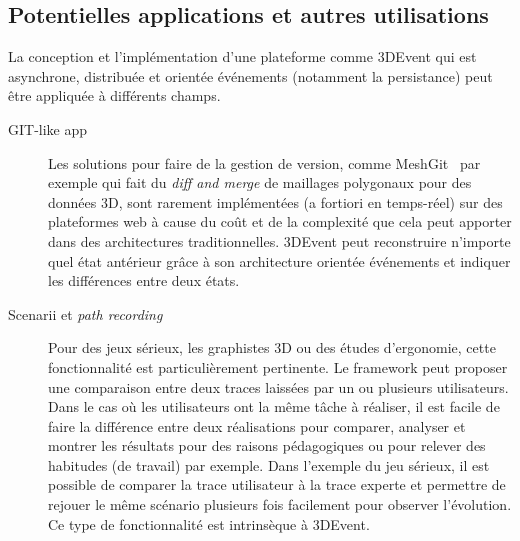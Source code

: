 \subsection{Potentielles applications et autres utilisations}
La conception et l'implémentation d'une plateforme comme 3DEvent qui est 
asynchrone, distribuée et orientée événements  (notamment la persistance) peut 
être appliquée à différents champs.
\begin{description}
	\item[GIT-like app] Les solutions pour faire de la gestion de version, comme 
	MeshGit~\cite{Denning2013} par exemple qui fait du
	\textit{diff and merge} de maillages polygonaux pour des données 3D, 
	sont rarement implémentées (a fortiori en 
	temps-réel) sur des plateformes web à cause du coût et de la complexité que 
	cela peut apporter dans des architectures traditionnelles. 3DEvent peut 
	reconstruire n'importe quel état antérieur grâce à son architecture orientée 
	événements et indiquer les différences entre deux états.%
	
	\item[Scenarii et \textit{path recording}] Pour des jeux sérieux, les graphistes 
	3D ou des études d'ergonomie, cette fonctionnalité est particulièrement 
	pertinente. Le \gls{framework} peut proposer une comparaison entre deux traces 
	laissées par un ou plusieurs utilisateurs. Dans le cas où les utilisateurs ont la 
	même tâche à réaliser, il est facile de faire la différence entre deux réalisations 
	pour comparer, analyser et montrer les résultats	pour des raisons 
	pédagogiques ou pour relever des habitudes (de travail) par exemple. Dans 
	l'exemple du jeu sérieux, il est possible de comparer la trace utilisateur à la trace experte 
	et permettre de rejouer le même scénario plusieurs fois facilement pour 
	observer l'évolution. Ce type de fonctionnalité est intrinsèque à 3DEvent. 
	

\end{description}
